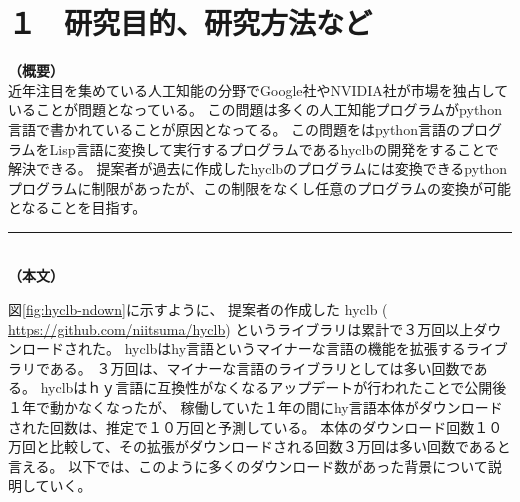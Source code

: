 \documentclass[11pt,a4j,dvipdfmx]{jarticle} 					%
\newcommand{\研究課題名}{人工知能のためのLispシステム}
\newcommand{\研究機関名}{大阪公立大学工業高等専門学校}
\newcommand{\研究代表者氏名}{新妻弘崇}
\newcommand{\研究期間の最終元号年度}{11}  %
\begin{document}

\section{１　研究目的、研究方法など}

\noindent
\textbf{（概要）}\\
近年注目を集めている人工知能の分野でGoogle社やNVIDIA社が市場を独占していることが問題となっている。
この問題は多くの人工知能プログラムがpython言語で書かれていることが原因となってる。
この問題をはpython言語のプログラムをLisp言語に変換して実行するプログラムであるhyclbの開発をすることで解決できる。
提案者が過去に作成したhyclbのプログラムには変換できるpythonプログラムに制限があったが、この制限をなくし任意のプログラムの変換が可能となることを目指す。



\noindent
\rule{\linewidth}{1pt}\\
\noindent
\textbf{（本文）}



図\ref{fig:hyclb-ndown}に示すように、
提案者の作成した hyclb (\url{ https://github.com/niitsuma/hyclb})
というライブラリは累計で３万回以上ダウンロードされた。
hyclbはhy言語というマイナーな言語の機能を拡張するライブラリである。
３万回は、マイナーな言語のライブラリとしては多い回数である。
hyclbはｈｙ言語に互換性がなくなるアップデートが行われたことで公開後１年で動かなくなったが、
稼働していた１年の間にhy言語本体がダウンロードされた回数は、推定で１０万回と予測している。
本体のダウンロード回数１０万回と比較して、その拡張がダウンロードされる回数３万回は多い回数であると言える。
以下では、このように多くのダウンロード数があった背景について説明していく。


\end{document}
